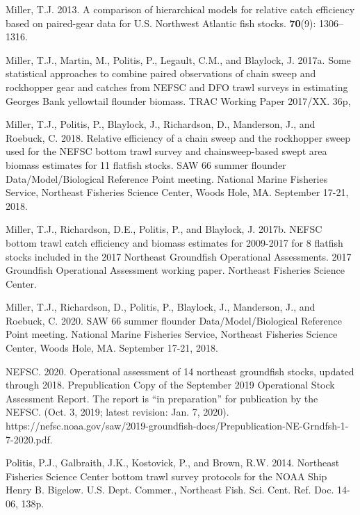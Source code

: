 \documentclass[]{article}
\begin{document}
\leavevmode\hypertarget{ref-miller13}{}%
Miller, T.J. 2013. A comparison of hierarchical models for relative
catch efficiency based on paired-gear data for U.S. Northwest Atlantic
fish stocks. \textbf{70}(9): 1306--1316.

\leavevmode\hypertarget{ref-milleretal17a}{}%
Miller, T.J., Martin, M., Politis, P., Legault, C.M., and Blaylock, J.
2017a. Some statistical approaches to combine paired observations of
chain sweep and rockhopper gear and catches from NEFSC and DFO trawl
surveys in estimating Georges Bank yellowtail flounder biomass. TRAC
Working Paper 2017/XX. 36p,

\leavevmode\hypertarget{ref-milleretal18}{}%
Miller, T.J., Politis, P., Blaylock, J., Richardson, D., Manderson, J.,
and Roebuck, C. 2018. Relative efficiency of a chain sweep and the
rockhopper sweep used for the NEFSC bottom trawl survey and
chainsweep-based swept area biomass estimates for 11 flatfish stocks.
SAW 66 summer flounder Data/Model/Biological Reference Point meeting.
National Marine Fisheries Service, Northeast Fisheries Science Center,
Woods Hole, MA. September 17-21, 2018.

\leavevmode\hypertarget{ref-milleretal17b}{}%
Miller, T.J., Richardson, D.E., Politis, P., and Blaylock, J. 2017b.
NEFSC bottom trawl catch efficiency and biomass estimates for 2009-2017
for 8 flatfish stocks included in the 2017 Northeast Groundfish
Operational Assessments. 2017 Groundfish Operational Assessment working
paper. Northeast Fisheries Science Center.

\leavevmode\hypertarget{ref-milleretal20}{}%
Miller, T.J., Richardson, D., Politis, P., Blaylock, J., Manderson, J.,
and Roebuck, C. 2020. SAW 66 summer flounder Data/Model/Biological
Reference Point meeting. National Marine Fisheries Service, Northeast
Fisheries Science Center, Woods Hole, MA. September 17-21, 2018.

\leavevmode\hypertarget{ref-nefsc2020}{}%
NEFSC. 2020. Operational assessment of 14 northeast groundfish stocks,
updated through 2018. Prepublication Copy of the September 2019
Operational Stock Assessment Report. The report is ``in preparation''
for publication by the NEFSC. (Oct. 3, 2019; latest revision: Jan. 7,
2020).
https://nefsc.noaa.gov/saw/2019-groundfish-docs/Prepublication-NE-Grndfsh-1-7-2020.pdf.

\leavevmode\hypertarget{ref-politisetal14}{}%
Politis, P.J., Galbraith, J.K., Kostovick, P., and Brown, R.W. 2014.
Northeast Fisheries Science Center bottom trawl survey protocols for the
NOAA Ship Henry B. Bigelow. U.S. Dept. Commer., Northeast Fish. Sci.
Cent. Ref. Doc. 14-06, 138p.
\end{document}
